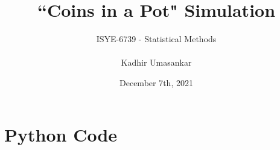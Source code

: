 \documentclass[12pt]{report}
\author{ISYE-6739 - Statistical Methods \\\\ Kadhir Umasankar}
\title{``Coins in a Pot" Simulation}
\date{December 7th, 2021}
\theoremstyle{definition}
\begin{document}
\maketitle











\appendix
\chapter{Python Code}
\label{pythoncode}
\inputminted[linenos=true, breaklines=true, breakanywhere=true, fontsize=\footnotesize]{python}{../isye-6739-project/dice-game.py}
\end{document}
